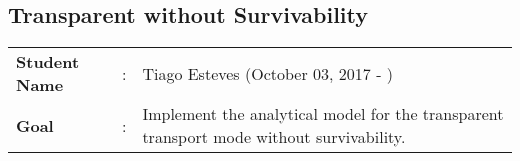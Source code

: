 \clearpage

\subsection{Transparent without Survivability}\label{analytical_Transp_Survivability}
\begin{tcolorbox}	
\begin{tabular}{p{2.75cm} p{0.2cm} p{10.5cm}} 	
\textbf{Student Name}  &:& Tiago Esteves    (October 03, 2017 - )\\
\textbf{Goal}          &:& Implement the analytical model for the transparent transport mode without survivability.
\end{tabular}
\end{tcolorbox}
\vspace{11pt}

